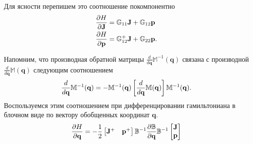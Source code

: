 \documentclass[12pt]{article}
\newcommand{\mf}{\mathbf}
\newcommand{\lsq}{\left[}
\newcommand{\rsq}{\right]}
\newcommand{\bbB}{\mathbb{B}}
\newcommand{\bbG}{\mathbb{G}}
\newcommand{\bbM}{\mathbb{M}}
\newcommand{\mfq}{\mf{q}}
\newcommand{\mfp}{\mf{p}}
\newcommand{\mfJ}{\mf{J}}
\begin{document}
Для ясности перепишем это соотношение покомпонентно
\begin{gather}
    \begin{aligned}
        \frac{\partial H}{\partial \mfJ} &= \bbG_{11} \mfJ + \bbG_{12} \mfp \\
        \frac{\partial H}{\partial \mfp} &= \bbG_{12}^+ \mfJ + \bbG_{22} \mfp.
    \end{aligned} \notag 
\end{gather}

Напомним, что производная обратной матрицы $\displaystyle \frac{d}{d\mfq} \bbM^{-1}(\mfq)$ связана с производной $\displaystyle \frac{d}{d\mfq} \bbM(\mfq)$ следующим соотношением
\begin{gather}
    \frac{d}{d\mfq} \bbM^{-1}(\mfq) = -\bbM^{-1}(\mfq) \lsq \frac{d}{d\mfq} \bbM(\mfq) \rsq \bbM^{-1}(\mfq). \notag
\end{gather}
Воспользуемся этим соотношением при дифференцировании гамильтониана в блочном виде по вектору обобщенных координат $\mfq$.
\begin{gather}
    \frac{\partial H}{\partial \mfq} = - \frac{1}{2}
    \begin{bmatrix}
        \mfJ^+ & \mfp^+ 
    \end{bmatrix}
    \bbB^{-1} \frac{\partial \bbB}{\partial \mfq} \bbB^{-1}
    \begin{bmatrix}
        \mfJ \\
        \mfp
    \end{bmatrix} \notag
\end{gather}
\end{document}
